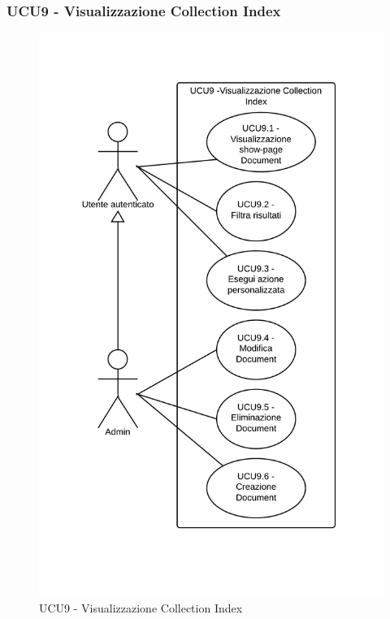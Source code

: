 \subsubsection{UCU9 - Visualizzazione Collection Index} 
    \begin{figure}[H]
      \includegraphics[width=12cm]{UML/UCU9 - Visualizzazione Collection Index.png}
      \caption{UCU9 - Visualizzazione Collection Index} 
    \end{figure}
    
